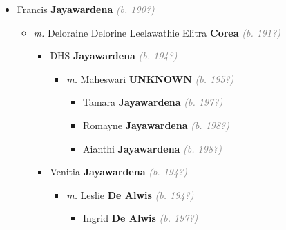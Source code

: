 \documentclass[10pt, openany]{book}
\begin{document}
\begin{itemize}
{\begin{itemize}
{\begin{itemize}
{\begin{itemize}
{\begin{itemize}
{\begin{itemize}
{\begin{itemize}
{\begin{itemize}
{}
\end{itemize}}
\end{itemize}
 }
\item{Veronica \textbf{Jayawardena} \textcolor{gray}{\textit{(b. 198?)}}
\begin{itemize}
\item{ \textbf{UNKNOWN} \textcolor{gray}{\textit{(b. 201?)}}
}
\end{itemize}
 }
\end{itemize}}
\end{itemize}
 }
\end{itemize}}
\end{itemize}
 }
\item{Francis \textbf{Jayawardena} \textcolor{gray}{\textit{(b. 190?)}}
\begin{itemize}
\item{\textit{m.} Deloraine Delorine Leelawathie Elitra \textbf{Corea} \textcolor{gray}{\textit{(b. 191?)}}   \label{couple:00003262:00003263} \begin{itemize}
\item{DHS \textbf{Jayawardena} \textcolor{gray}{\textit{(b. 194?)}}
\begin{itemize}
\item{\textit{m.} Maheswari \textbf{UNKNOWN} \textcolor{gray}{\textit{(b. 195?)}}   \label{couple:00003278:00003279} \begin{itemize}
\item{Tamara \textbf{Jayawardena} \textcolor{gray}{\textit{(b. 197?)}}
 }
\item{Romayne \textbf{Jayawardena} \textcolor{gray}{\textit{(b. 198?)}}
 }
\item{Aianthi \textbf{Jayawardena} \textcolor{gray}{\textit{(b. 198?)}}
 }
\end{itemize}}
\end{itemize}
 }
\item{Venitia \textbf{Jayawardena} \textcolor{gray}{\textit{(b. 194?)}}
\begin{itemize}
\item{\textit{m.} Leslie \textbf{De Alwis} \textcolor{gray}{\textit{(b. 194?)}}   \label{couple:00003267:00003268} \begin{itemize}
\item{Ingrid \textbf{De Alwis} \textcolor{gray}{\textit{(b. 197?)}}
}
\end{itemize}}
\end{itemize}}
\end{itemize}}
\end{itemize}}
\end{itemize}}
\end{itemize}
\end{document}
